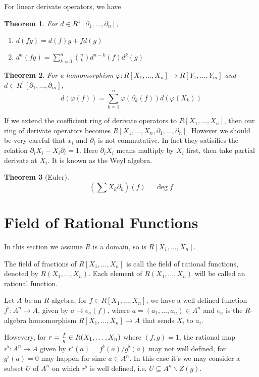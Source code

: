 \documentclass{article}
\newtheorem*{thm}{Theorem}
\begin{document}
For linear derivate operators, we have
\begin{thm}
For $d \in R^1[\partial_1, \dots, \partial_n]$,
\begin{enumerate}
\item $d(fg) = d(f)g + fd(g)$
\item $d^n(fg) = \sum^n_{k=0} {n \choose k}d^{n-k}(f) d^k(g)$
\end{enumerate}
\end{thm}

\begin{thm}
For a homomorphism $\varphi : R[X_1, \dots, X_n] \to R[Y_1, \dots, Y_m]$
and $d \in R^1[\partial_1, \dots, \partial_m]$,
$$d(\varphi(f)) = \sum_{k=1}^n \varphi(\partial_k(f)) d(\varphi(X_k))$$
\end{thm}

If we extend the coefficient ring of derivate operators to $R[X_1, \dots, X_n]$,
then our ring of derivate operators becomes $R[X_1, \dots, X_n, \partial_1, \dots, \partial_n]$.
However we should be very careful that $x_i$ and $\partial_i$ is not commutative.
In fact they satisifies the relation $\partial_i X_i - X_i \partial_i = 1$.
Here $\partial_i X_i$ means multiply by $X_i$ first, then take partial derivate at $X_i$.
It is known as the Weyl algebra.

\begin{thm}[Euler]
$$(\sum X_k \partial_k)(f) = \deg f$$
\end{thm}

\section{Field of Rational Functions}
In this section we assume $R$ is a domain, so is $R[X_1, \dots, X_n]$.

The field of fractions of $R[X_1, \dots, X_n]$ is call the field of rational functions,
denoted by $R(X_1, \dots, X_n)$. Each element of $R(X_1, \dots, X_n)$ will be called an
rational function.

Let $A$ be an $R$-algebra, for $f \in R[X_1, \dots, X_n]$, we have a well defined function
$f^\flat : A^n \to A$, given by $a \to e_a(f)$, where $a = (a_1, \dots, a_n) \in A^n$
and $e_a$ is the $R$-algebra homomorphism $R[X_1, \dots, X_n] \to A$ that sends $X_i$ to $a_i$.

Howevery, for $r = {f \over g} \in R(X_1, \dots, X_n)$ where $(f, g) = 1$, the rational map
$r^\flat : A^n \to A$ given by $r^\flat(a) = f^\flat(a) / g^\flat(a)$
may not well defined, for $g^\flat(a) = 0$ may happen for sime $a \in A^n$.
In this case it's we may consider a subset $U$ of $A^n$ on which $r^\flat$ is well defined,
i.e. $U \subseteq A^n \backslash Z(g)$.
\end{document}
